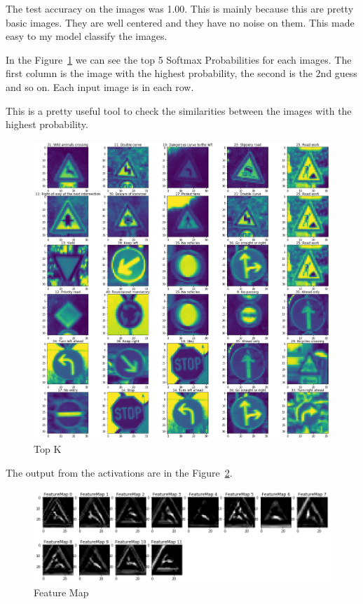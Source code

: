 \documentclass[11pt, a4paper]{article}
\begin{document}
The test accuracy on the images was 1.00. This is mainly because this are pretty basic images. They are well centered and they have no noise on them. This made easy to my model classify the images.  







In the Figure~\ref{fig:top_k} we can see the top 5 Softmax Probabilities for each images. The first column is the image with the highest probability, the second is the 2nd guess and so on. Each input image is in each row. 


This is a pretty useful tool to check the similarities between the images with the highest probability.


\begin{figure}[htpb!]
	\centering
	\includegraphics[width=0.8\linewidth]{top_k}
	\caption{Top K}
	\label{fig:top_k}
\end{figure}






The output from the activations are in the Figure~\ref{fig:feature_map}. 


\begin{figure}[htpb!]
	\centering
	\includegraphics[width=0.8\linewidth]{feature_map}
	\caption{Feature Map}
	\label{fig:feature_map}
\end{figure}
\end{document}
